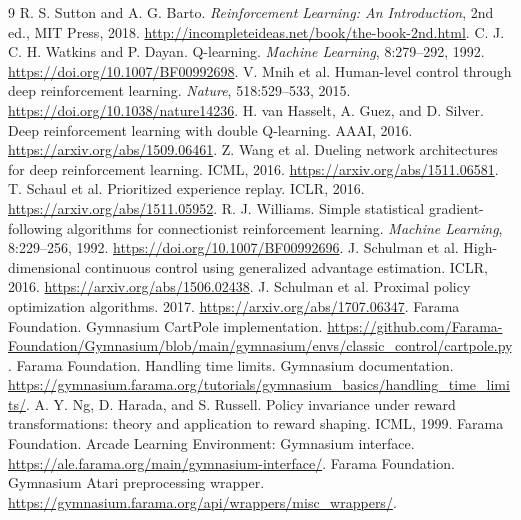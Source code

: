 \documentclass[11pt,a4paper]{article}
\begin{document}
\begin{thebibliography}{9}
 R. S. Sutton and A. G. Barto. \emph{Reinforcement Learning: An Introduction}, 2nd ed., MIT Press, 2018. \url{http://incompleteideas.net/book/the-book-2nd.html}.
 C. J. C. H. Watkins and P. Dayan. Q-learning. \emph{Machine Learning}, 8:279--292, 1992. \url{https://doi.org/10.1007/BF00992698}.
 V. Mnih et al. Human-level control through deep reinforcement learning. \emph{Nature}, 518:529--533, 2015. \url{https://doi.org/10.1038/nature14236}.
 H. van Hasselt, A. Guez, and D. Silver. Deep reinforcement learning with double Q-learning. AAAI, 2016. \url{https://arxiv.org/abs/1509.06461}.
 Z. Wang et al. Dueling network architectures for deep reinforcement learning. ICML, 2016. \url{https://arxiv.org/abs/1511.06581}.
 T. Schaul et al. Prioritized experience replay. ICLR, 2016. \url{https://arxiv.org/abs/1511.05952}.
 R. J. Williams. Simple statistical gradient-following algorithms for connectionist reinforcement learning. \emph{Machine Learning}, 8:229--256, 1992. \url{https://doi.org/10.1007/BF00992696}.
 J. Schulman et al. High-dimensional continuous control using generalized advantage estimation. ICLR, 2016. \url{https://arxiv.org/abs/1506.02438}.
 J. Schulman et al. Proximal policy optimization algorithms. 2017. \url{https://arxiv.org/abs/1707.06347}.
 Farama Foundation. Gymnasium CartPole implementation. \url{https://github.com/Farama-Foundation/Gymnasium/blob/main/gymnasium/envs/classic_control/cartpole.py}.
 Farama Foundation. Handling time limits. Gymnasium documentation. \url{https://gymnasium.farama.org/tutorials/gymnasium_basics/handling_time_limits/}.
 A. Y. Ng, D. Harada, and S. Russell. Policy invariance under reward transformations: theory and application to reward shaping. ICML, 1999.
 Farama Foundation. Arcade Learning Environment: Gymnasium interface. \url{https://ale.farama.org/main/gymnasium-interface/}.
 Farama Foundation. Gymnasium Atari preprocessing wrapper. \url{https://gymnasium.farama.org/api/wrappers/misc_wrappers/}.
\end{thebibliography}
\end{document}

